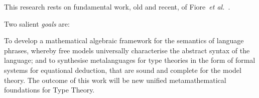 \documentclass[11pt,twocolumn]{article}
\newcounter{CC}
\newenvironment{resenumerate}
  {\begin{list}{[\textbf{\arabic{CC}]}}
  {\usecounter{CC}
   \setlength{\topsep}{2pt}
   \setlength{\partopsep}{2pt}
   \setlength{\itemsep}{2.5pt}
   \setlength{\parsep}{2.5pt}
   \setlength{\leftmargin}{1.65em}
   \setlength{\labelwidth}{1.15em}
 }}
  {\end{list}}
\newcommand{\hide}[1]{}
\newcommand{\emgoal}[1]{#1}%
\newcommand{\viz}{\emph{viz.}}
\newcommand{\etal}{\emph{et al.}}
\begin{document}
This research rests on fundamental work, old and recent, of
Fiore~\etal~\cite{FiorePlotkinTuri,FioreLICS08,FioreHurLMCS,FioreSecOrdEqLog,FioreMahmoud,FioreICALP2012}.
\hide{
that started with the first algebraic model of abstract syntax with variable
binding and progressively led to an extension of the Algebraic Trinity to the
realm of Binding Algebra (\viz~algebraic languages with binding operators).
%
The further extension to simple type theories should follow along similar
lines further taking into account the algebraic structure of types.  As for
the other points of the research space in
Figure\,\ref{TypeTheoryResearchSpace}, they are yet to be investigated.
}
Two salient \emph{goals} are:
%
\emgoal{
  To develop a mathematical algebraic framework for the semantics of language
  phrases, whereby free models universally characterise the abstract syntax of
  the language;
  and 
%
  to %
  synthesise metalanguages for type theories in the form of formal systems for
  equational deduction, that are sound and complete for the model theory.}
%
%
%
The outcome of this work will be new unified metamathematical foundations for
Type Theory.

\hide{
The outcome of this work will be mathematical foundations for the
aforementioned aspects of type theories that are currently treated in an
ad~hoc fashion.  
}
\hide{
Furthermore, it will provide a principled approach by which
to reconsider the problem of integrating polymorphism and dependent types. 
}

\hide{ polynomial functors (from discrete to groupoidal) --- the meaning of
  typing rules}
\end{document}
